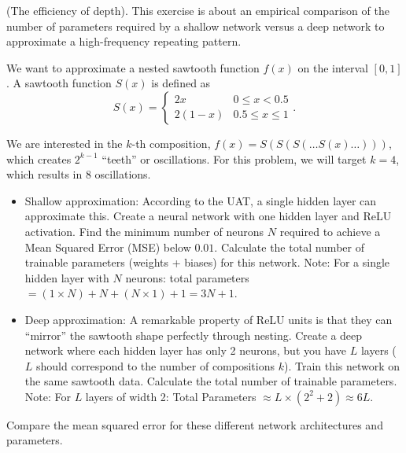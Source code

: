 \begin{myexercise}(The efficiency of depth).
This exercise is about an empirical comparison of the number of parameters required by a shallow network versus a deep network to approximate a high-frequency repeating pattern.

We want to approximate a nested sawtooth function $f(x)$ on the interval $[0, 1]$. A sawtooth function $S(x)$ is defined as
$$S(x) = \begin{cases} 2x & 0 \le x < 0.5 \\ 2(1-x) & 0.5 \le x \le 1 \end{cases}.$$

We are interested in the $k$-th composition, $f(x) = S(S(S(\dots S(x) \dots )))$, which creates $2^{k-1}$ ``teeth'' or oscillations. For this problem, we will target $k=4$, which results in 8 oscillations.

\begin{itemize}
\item  Shallow approximation:
According to the UAT, a single hidden layer can approximate this. Create a neural network with one hidden layer and ReLU activation. Find the minimum number of neurons $N$ required to achieve a Mean Squared Error (MSE) below $0.01$.
Calculate the total number of trainable parameters (weights + biases) for this network. Note: For a single hidden layer with $N$ neurons: total parameters $= (1 \times N) + N + (N \times 1) + 1 = 3N + 1$.
\item Deep approximation:
A remarkable property of ReLU units is that they can ``mirror'' the sawtooth shape perfectly through nesting.
Create a deep network where each hidden layer has only 2 neurons, but you have $L$ layers ($L$ should correspond to the number of compositions $k$).
Train this network on the same sawtooth data.
Calculate the total number of trainable parameters. Note: For $L$ layers of width 2: Total Parameters $\approx L \times (2^2 + 2) \approx 6L$.
\end{itemize}

Compare the mean squared error for these different network architectures and parameters.
\end{myexercise}


